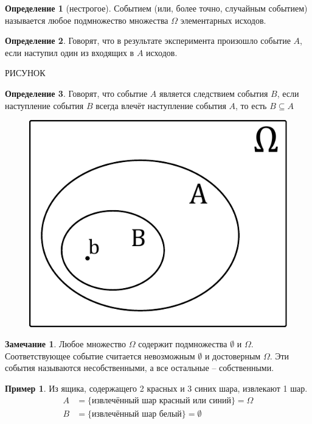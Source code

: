 \documentclass[a4paper, 14pt]{report}
\theoremstyle{definition}
\newtheorem*{definition}{Определение}
\newtheorem*{note}{Замечание}
\newtheorem*{example}{Пример}
\begin{document}
			\begin{definition}[нестрогое]
				Событием (или, более точно, случайным событием) называется любое подмножество множества $\Omega$ элементарных исходов.
			\end{definition}
			
			\begin{definition}
				Говорят, что в результате эксперимента произошло событие $A$, если наступил один из входящих в $A$ исходов.
			\end{definition}
			
			РИСУНОК
			
			\begin{definition}
				Говорят, что событие $A$ является следствием события $B$, если наступление события $B$ всегда влечёт наступление события $A$, то есть $B\subseteq A$
			\end{definition}
		
			\begin{figure}[!ht]
				\centering
				\includegraphics[width=0.3\linewidth]{probability_subsets}
				\caption{}
				\label{fig:probability_subsets}
			\end{figure}
			
			\begin{note}
				Любое множество $\Omega$ содержит подмножества $\emptyset$ и $\Omega$. Соответствующее событие считается невозможным $\emptyset$ и достоверным $\Omega$. Эти события называются несобственными, а все остальные -- собственными.
			\end{note}
			
			\begin{example}
				Из ящика, содержащего 2 красных и 3 синих шара, извлекают 1 шар.
				\begin{subequations}
					\begin{align}
						A&=\{\text{извлечённый шар красный или синий}\}=\Omega \\
						B&=\{\text{извлечённый шар белый}\}=\emptyset
					\end{align}
				\end{subequations}
			\end{example}
		
\end{document}
